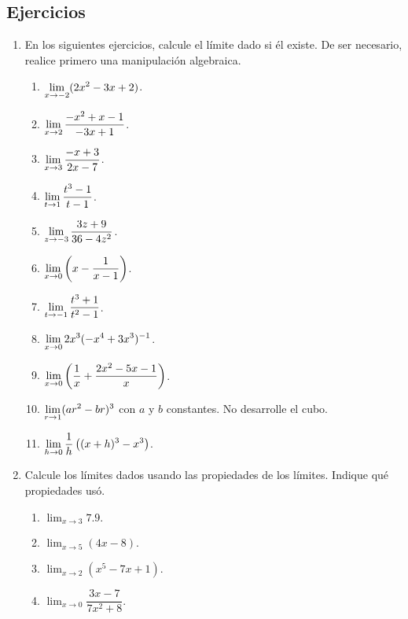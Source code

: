 \subsection{Ejercicios}
\begingroup
\small
\begin{multicols}{2}
\begin{enumerate}[leftmargin=*]
\item En los siguientes ejercicios, calcule el límite dado si él existe. De ser necesario,
    realice primero una manipulación algebraica.
\begin{enumerate}[leftmargin=*]
\item $\displaystyle\limjc{(2x^2 - 3x + 2)}{x}{-2}$.
\item $\displaystyle\limjc{\frac{-x^2 + x - 1}{-3x + 1}}{x}{2}$.
\item $\displaystyle\limjc{\frac{-x + 3}{2x - 7}}{x}{3}$.
\item $\displaystyle\limjc{\frac{t^3 - 1}{t - 1}}{t}{1}$.
\item $\displaystyle\limjc{\frac{3z + 9}{36 - 4z^2}}{z}{-3}$.
\item $\displaystyle\limjc{\left(x - \frac{1}{x - 1}\right)}{x}{0}$.
\item $\displaystyle\limjc{\frac{t^3+1}{t^2 - 1}}{t}{-1}$.
\item $\displaystyle\limjc{2x^3(-x^4 + 3x^3)^{-1}}{x}{0}$.
\item $\displaystyle\limjc{\left(\frac{1}{x} + \frac{2x^2 - 5x - 1}{x}\right)}{x}{0}$.
\item $\displaystyle\limjc{(ar^2 - br)^3}{r}{1}$ con $a$ y $b$ constantes. No desarrolle el
    cubo.
\item $\displaystyle\limjc{\frac{1}{h}\left((x + h)^3 - x^3\right)}{h}{0}$.
\end{enumerate}

\item Calcule los límites dados usando las propiedades de los límites. Indique qué propiedades
    usó.
\begin{enumerate}[leftmargin=*]
\item $\displaystyle
	\lim_{x\to 3}7.9.
$
\item $\displaystyle
	\lim_{x\to 5}(4x-8).
$
\item $\displaystyle
	\lim_{x\to 2}(x^5-7x+1).
$
\item $\displaystyle
	\lim_{x\to 0}\dfrac{3x-7}{7x^2+8}.
$
\end{enumerate}

\end{enumerate}
\end{multicols}
\endgroup

